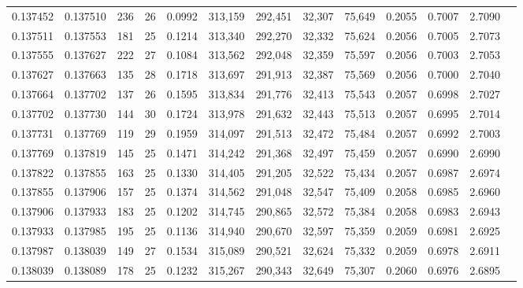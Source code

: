 \begin{tabular}{rrrrrrrrrrrrr}
0.137452 & 0.137510 & 236 &  26 &                                     0.0992 & 313,159 & 292,451 &  32,307 &  75,649 & 0.2055 & 0.7007 & 2.7090 \\
0.137511 & 0.137553 & 181 &  25 &                                     0.1214 & 313,340 & 292,270 &  32,332 &  75,624 & 0.2056 & 0.7005 & 2.7073 \\
0.137555 & 0.137627 & 222 &  27 &                                     0.1084 & 313,562 & 292,048 &  32,359 &  75,597 & 0.2056 & 0.7003 & 2.7053 \\
0.137627 & 0.137663 & 135 &  28 &                                     0.1718 & 313,697 & 291,913 &  32,387 &  75,569 & 0.2056 & 0.7000 & 2.7040 \\
0.137664 & 0.137702 & 137 &  26 &                                     0.1595 & 313,834 & 291,776 &  32,413 &  75,543 & 0.2057 & 0.6998 & 2.7027 \\
0.137702 & 0.137730 & 144 &  30 &                                     0.1724 & 313,978 & 291,632 &  32,443 &  75,513 & 0.2057 & 0.6995 & 2.7014 \\
0.137731 & 0.137769 & 119 &  29 &                                     0.1959 & 314,097 & 291,513 &  32,472 &  75,484 & 0.2057 & 0.6992 & 2.7003 \\
0.137769 & 0.137819 & 145 &  25 &                                     0.1471 & 314,242 & 291,368 &  32,497 &  75,459 & 0.2057 & 0.6990 & 2.6990 \\
0.137822 & 0.137855 & 163 &  25 &                                     0.1330 & 314,405 & 291,205 &  32,522 &  75,434 & 0.2057 & 0.6987 & 2.6974 \\
0.137855 & 0.137906 & 157 &  25 &                                     0.1374 & 314,562 & 291,048 &  32,547 &  75,409 & 0.2058 & 0.6985 & 2.6960 \\
0.137906 & 0.137933 & 183 &  25 &                                     0.1202 & 314,745 & 290,865 &  32,572 &  75,384 & 0.2058 & 0.6983 & 2.6943 \\
0.137933 & 0.137985 & 195 &  25 &                                     0.1136 & 314,940 & 290,670 &  32,597 &  75,359 & 0.2059 & 0.6981 & 2.6925 \\
0.137987 & 0.138039 & 149 &  27 &                                     0.1534 & 315,089 & 290,521 &  32,624 &  75,332 & 0.2059 & 0.6978 & 2.6911 \\
0.138039 & 0.138089 & 178 &  25 &                                     0.1232 & 315,267 & 290,343 &  32,649 &  75,307 & 0.2060 & 0.6976 & 2.6895 \\

\end{tabular}
